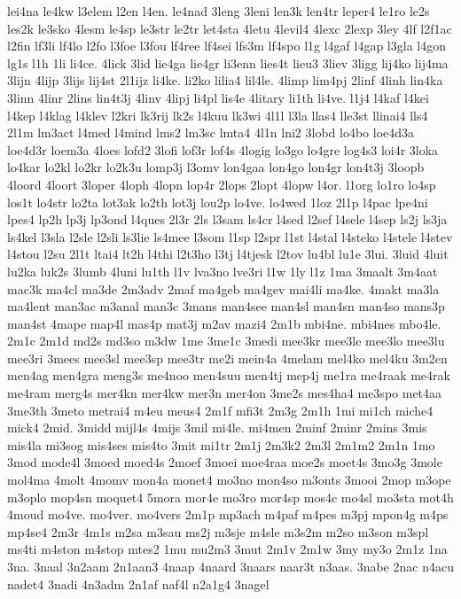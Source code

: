 {lei4na
le4kw
l3elem
l2en
l4en.
le4nad
3leng
3leni
len3k
len4tr
leper4
le1ro
le2s
les2k
le3sko
4lesm
le4sp
le3str
le2tr
let4sta
4letu
4levil4
4lexc
2lexp
3ley
4lf
l2f1ac
l2fin
lf3li
lf4lo
l2fo
l3foe
l3fou
lf4ree
lf4sei
lfs3m
lf4spo
l1g
l4gaf
l4gap
l3gla
l4gon
lg1s
l1h
1li
li4ce.
4lick
3lid
lie4ga
lie4gr
li3enn
lies4t
lieu3
3liev
3ligg
lij4ko
lij4ma
3lijn
4lijp
3lijs
lij4st
2l1ijz
li4ke.
li2ko
lilia4
lil4le.
4limp
lim4pj
2linf
4linh
lin4ka
3linn
4linr
2lins
lin4t3j
4linv
4lipj
li4pl
lis4e
4litary
li1th
li4ve.
l1j4
l4kaf
l4kei
l4kep
l4klag
l4klev
l2kri
lk3rij
lk2s
l4kuu
lk3wi
4l1l
l3la
llas4
lle3st
llinai4
lls4
2l1m
lm3act
l4med
l4mind
lms2
lm3sc
lmta4
4l1n
lni2
3lobd
lo4bo
loe4d3a
loe4d3r
loem3a
4loes
lofd2
3lofi
lof3r
lof4s
4logig
lo3go
lo4gre
log4s3
loi4r
3loka
lo4kar
lo2kl
lo2kr
lo2k3u
lomp3j
l3omv
lon4gaa
lon4go
lon4gr
lon4t3j
3loopb
4loord
4loort
3loper
4loph
4lopn
lop4r
2lops
2lopt
4lopw
l4or.
l1org
lo1ro
lo4sp
los1t
lo4str
lo2ta
lot3ak
lo2th
lot3j
lou2p
lo4ve.
lo4wed
1loz
2l1p
l4pac
lpe4ni
lpes4
lp2h
lp3j
lp3ond
l4ques
2l3r
2ls
l3sam
ls4cr
l4sed
l2sef
l4sele
l4sep
ls2j
ls3ja
ls4kel
l3sla
l2sle
l2sli
ls3lie
ls4mee
l3som
l1sp
l2spr
l1st
l4stal
l4steko
l4stele
l4stev
l4stou
l2su
2l1t
ltai4
lt2h
l4thi
l2t3ho
l3tj
l4tjesk
l2tov
lu4bl
lu1e
3lui.
3luid
4luit
lu2ka
luk2s
3lumb
4luni
lu1th
l1v
lva3no
lve3ri
l1w
1ly
l1z
1ma
3maalt
3m4aat
mac3k
ma4cl
ma3de
2m3adv
2maf
ma4geb
ma4gev
mai4li
ma4ke.
4makt
ma3la
ma4lent
man3ac
m3anal
man3c
3mans
man4see
man4sl
man4sn
man4so
mans3p
man4st
4mape
map4l
mas4p
mat3j
m2av
mazi4
2m1b
mbi4ne.
mbi4nes
mbo4le.
2m1c
2m1d
md2s
md3so
m3dw
1me
3me1c
3medi
mee3kr
mee3le
mee3lo
mee3lu
mee3ri
3mees
mee3sl
mee3sp
mee3tr
me2i
mein4a
4melam
mel4ko
mel4ku
3m2en
men4ag
men4gra
meng3s
me4noo
men4suu
men4tj
mep4j
me1ra
me4raak
me4rak
me4ram
merg4s
mer4kn
mer4kw
mer3n
mer4on
3me2s
mes4ha4
me3spo
met4aa
3me3th
3meto
metrai4
m4eu
meus4
2m1f
mfi3t
2m3g
2m1h
1mi
mi1ch
miche4
mick4
2mid.
3midd
mijl4s
4mijs
3mil
mi4le.
mi4men
2minf
2minr
2mins
3mis
mis4la
mi3sog
mis4ses
mis4to
3mit
mi1tr
2m1j
2m3k2
2m3l
2m1m2
2m1n
1mo
3mod
mode4l
3moed
moed4s
2moef
3moei
moe4raa
moe2s
moet4s
3mo3g
3mole
mol4ma
4molt
4momv
mon4a
monet4
mo3no
mon4so
m3onts
3mooi
2mop
m3ope
m3oplo
mop4sn
moquet4
5mora
mor4e
mo3ro
mor4sp
mos4c
mo4sl
mo3sta
mot4h
4moud
mo4ve.
mo4ver.
mo4vers
2m1p
mp3ach
m4paf
m4pes
m3pj
mpon4g
m4ps
mp4se4
2m3r
4m1s
m2sa
m3sau
ms2j
m3sje
m4sle
m3s2m
m2so
m3son
m3spl
ms4ti
m4ston
m4stop
mtes2
1mu
mu2m3
3mut
2m1v
2m1w
3my
my3o
2m1z
1na
3na.
3naal
3n2aam
2n1aan3
4naap
4naard
3naars
naar3t
n3aas.
3nabe
2nac
n4acu
nadet4
3nadi
4n3adm
2n1af
naf4l
n2a1g4
3nagel
}
